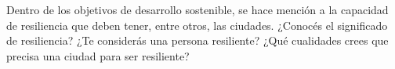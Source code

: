 

%
%
%



\clearpage
{}
\section*{\boldit{\textcolor{waveBlue2}{Ejercicio 5}}}Dentro de los objetivos de desarrollo sostenible, se hace mención a la capacidad de resiliencia que deben tener, entre otros, las ciudades. ¿Conocés el significado de resiliencia? ¿Te considerás una persona resiliente? ¿Qué cualidades crees que precisa una ciudad para ser resiliente?

